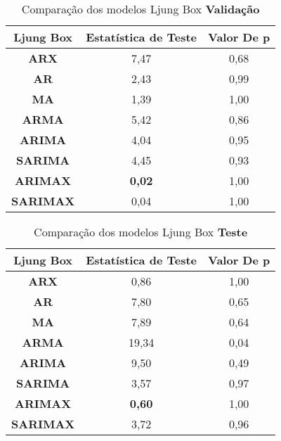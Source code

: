 \begin{table}[H]
	\centering
	\caption{Comparação dos modelos Ljung Box \textbf{Validação} }\label{tb:lbvld}
	\begin{tabular}{@{}ccc@{}}
		\toprule
		\textbf{Ljung Box} & \textbf{Estatística de Teste} & \textbf{Valor De p} \\ \midrule
\textbf{ARX}       & 7,47                          & 0,68                \\
\textbf{AR}        & 2,43                          & 0,99                \\
\textbf{MA}        & 1,39                          & 1,00                \\
\textbf{ARMA}      & 5,42                          & 0,86                \\
\textbf{ARIMA}     & 4,04                          & 0,95                \\
\textbf{SARIMA}    & 4,45                          & 0,93                \\
\textbf{ARIMAX}    & \textbf{0,02}                          & 1,00                \\
\textbf{SARIMAX}   & 0,04                          & 1,00                \\ \bottomrule
	\end{tabular}

\end{table}

\begin{table}[H]
	\centering
	\caption{Comparação dos modelos Ljung Box \textbf{Teste} }\label{tb:lbtst}
	\begin{tabular}{@{}ccc@{}}
		\toprule
		\textbf{Ljung Box} & \textbf{Estatística de Teste} & \textbf{Valor De p} \\ \midrule
\textbf{ARX}       & 0,86                          & 1,00                \\
\textbf{AR}        & 7,80                          & 0,65                \\
\textbf{MA}        & 7,89                          & 0,64                \\
\textbf{ARMA}      & 19,34                         & 0,04                \\
\textbf{ARIMA}     & 9,50                          & 0,49                \\
\textbf{SARIMA}    & 3,57                          & 0,97                \\
\textbf{ARIMAX}    & \textbf{0,60}                          & 1,00                \\
\textbf{SARIMAX}   & 3,72                          & 0,96                \\ \bottomrule
	\end{tabular}
	
\end{table}

